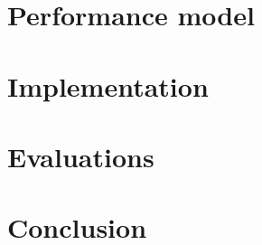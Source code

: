 \documentclass[5p]{elsarticle}
\begin{document}
\section{\mad}
\label{sec:forma_model}


\section{Performance model}
\label{sec:perf_model}


\section{Implementation}
\label{sec:implem}

\section{Evaluations}
\label{sec:evaluations}


\section{Conclusion}
\label{sec:conc}






%  

\end{document}
